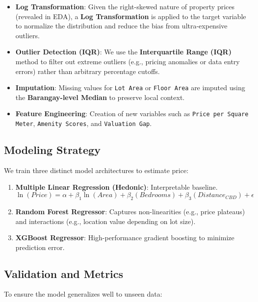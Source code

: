 \begin{itemize}
    \item \textbf{Log Transformation}: Given the right-skewed nature of property prices (revealed in EDA), a \textbf{Log Transformation} is applied to the target variable to normalize the distribution and reduce the bias from ultra-expensive outliers.
    \item \textbf{Outlier Detection (IQR)}: We use the \textbf{Interquartile Range (IQR)} method to filter out extreme outliers (e.g., pricing anomalies or data entry errors) rather than arbitrary percentage cutoffs.
    \item \textbf{Imputation}: Missing values for \texttt{Lot Area} or \texttt{Floor Area} are imputed using the \textbf{Barangay-level Median} to preserve local context.
    \item \textbf{Feature Engineering}: Creation of new variables such as \texttt{Price per Square Meter}, \texttt{Amenity Scores}, and \texttt{Valuation Gap}.
\end{itemize}

\subsection{Modeling Strategy}

We train three distinct model architectures to estimate price:

\begin{enumerate}
    \item \textbf{Multiple Linear Regression (Hedonic)}: Interpretable baseline.
    \begin{equation}
        \ln(Price) = \alpha + \beta_1 \ln(Area) + \beta_2 (Bedrooms) + \beta_3 (Distance_{CBD}) + \epsilon
    \end{equation}
    \item \textbf{Random Forest Regressor}: Captures non-linearities (e.g., price plateaus) and interactions (e.g., location value depending on lot size).
    \item \textbf{XGBoost Regressor}: High-performance gradient boosting to minimize prediction error.
\end{enumerate}

\subsection{Validation and Metrics}

To ensure the model generalizes well to unseen data:

